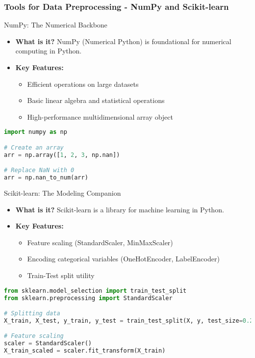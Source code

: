 \documentclass[aspectratio=169]{beamer}
\begin{document}
\begin{frame}[fragile]
    \frametitle{Tools for Data Preprocessing - NumPy and Scikit-learn}
    \begin{block}{NumPy: The Numerical Backbone}
        \begin{itemize}
            \item \textbf{What is it?}  
            NumPy (Numerical Python) is foundational for numerical computing in Python.
            \item \textbf{Key Features:}
            \begin{itemize}
                \item Efficient operations on large datasets
                \item Basic linear algebra and statistical operations
                \item High-performance multidimensional array object
            \end{itemize}
        \end{itemize}
    \end{block}
    \begin{lstlisting}[language=Python]
import numpy as np

# Create an array
arr = np.array([1, 2, 3, np.nan])

# Replace NaN with 0
arr = np.nan_to_num(arr)
    \end{lstlisting}
    
    \begin{block}{Scikit-learn: The Modeling Companion}
        \begin{itemize}
            \item \textbf{What is it?}  
            Scikit-learn is a library for machine learning in Python.
            \item \textbf{Key Features:}
            \begin{itemize}
                \item Feature scaling (StandardScaler, MinMaxScaler)
                \item Encoding categorical variables (OneHotEncoder, LabelEncoder)
                \item Train-Test split utility
            \end{itemize}
        \end{itemize}
    \end{block}
    \begin{lstlisting}[language=Python]
from sklearn.model_selection import train_test_split
from sklearn.preprocessing import StandardScaler

# Splitting data
X_train, X_test, y_train, y_test = train_test_split(X, y, test_size=0.2, random_state=42)

# Feature scaling
scaler = StandardScaler()
X_train_scaled = scaler.fit_transform(X_train)
    \end{lstlisting}
\end{frame}
\end{document}
